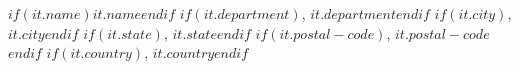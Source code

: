 $if(it.name)$$it.name$$endif$ 
$if(it.department)$, $it.department$$endif$ 
$if(it.city)$, $it.city$$endif$ 
$if(it.state)$, $it.state$$endif$ 
$if(it.postal-code)$, $it.postal-code$$endif$ 
$if(it.country)$, $it.country$$endif$